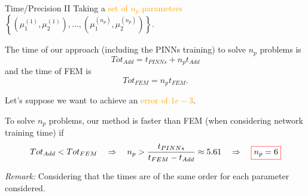 \begin{frame}{Time/Precision II}	
	Taking a \textcolor{orange}{set of $n_p$ parameters} $\left\{(\mu_1^{(1)},\mu_2^{(1)}),\dots,(\mu_1^{(n_p)},\mu_2^{(n_p)})\right\}$.
	
	The time of our approach (including the PINNs training) to solve $n_p$ problems is
	\vspace{-5pt}
	\begin{equation*}
		Tot_{Add}=t_{PINNs}+n_p t_{Add}
	\end{equation*}
	and the time of FEM is
	\begin{equation*}
		Tot_{FEM}=n_p t_{FEM}.
	\end{equation*}

	Let's suppose we want to achieve an \textcolor{orange}{error of $1e-3$}. 
	
	To solve $n_p$ problems, our method is faster than FEM (when considering network training time) if
	\begin{equation*}
		Tot_{Add}<Tot_{FEM} \quad \Rightarrow \quad n_p > \frac{t_{PINNs}}{t_{FEM}-t_{Add}}\approx 5.61\quad  \Rightarrow \quad \fcolorbox{red}{white}{$n_p=6$}
	\end{equation*}
	
	\footnotesize
	\textit{Remark:} Considering that the times are of the same order for each parameter considered.	
\end{frame}

%
